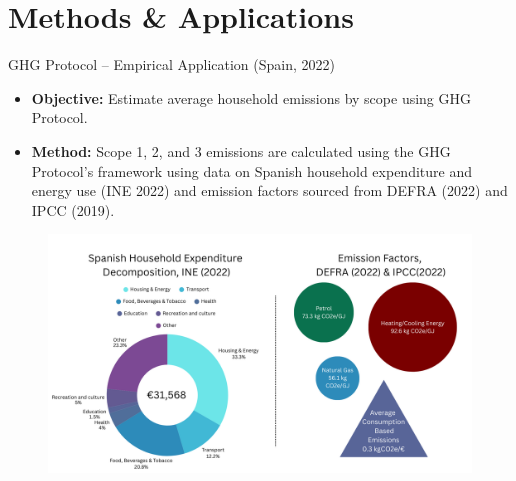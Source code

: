 \documentclass{beamer}
\begin{document}
\section{Methods \& Applications}

\begin{frame}{GHG Protocol – Empirical Application (Spain, 2022)}
\vspace{-2.5em}
  \footnotesize
  \begin{itemize}
\item \textbf{Objective:} Estimate average household emissions by scope using GHG Protocol.\\


\item \textbf{Method: }Scope 1, 2, and 3 emissions are calculated using the GHG Protocol's framework using data on Spanish household expenditure and energy use (INE 2022) and emission factors sourced from DEFRA (2022) and IPCC (2019).\\
  \end{itemize}

\vspace{-0.5em}
\begin{figure}
\centering
\includegraphics[width=0.8\linewidth]{Spanish Data Visual.png}
\end{figure}



\end{frame}
\end{document}
